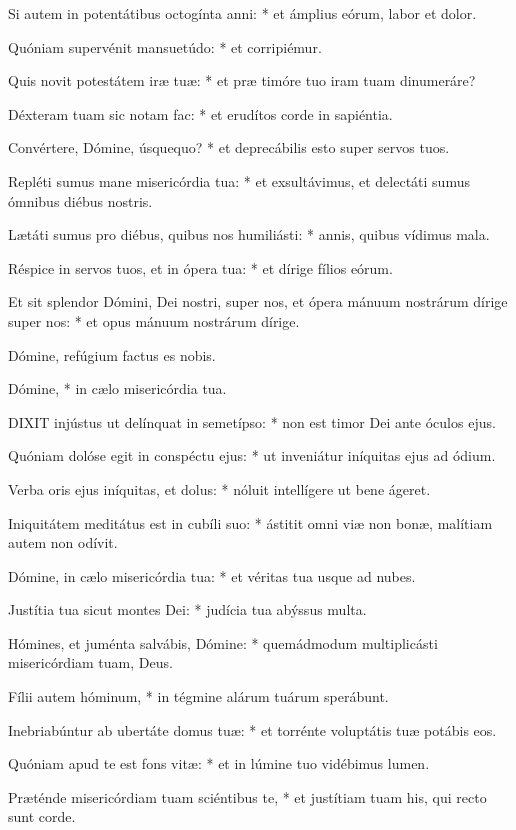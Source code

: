 Si autem in potentátibus octogínta anni: * et ámplius eórum, labor et dolor.

Quóniam supervénit mansuetúdo: * et corripiémur.

Quis novit potestátem iræ tuæ: * et præ timóre tuo iram tuam dinumeráre?

Déxteram tuam sic notam fac: * et erudítos corde in sapiéntia.

Convértere, Dómine, úsquequo? * et deprecábilis esto super servos tuos.

Repléti sumus mane misericórdia tua: * et exsultávimus, et delectáti sumus ómnibus diébus nostris.

Lætáti sumus pro diébus, quibus nos humiliásti: * annis, quibus vídimus mala.

Réspice in servos tuos, et in ópera tua: * et dírige fílios eórum.

Et sit splendor Dómini, Dei nostri, super nos, et ópera mánuum nostrárum dírige super nos: * et opus mánuum nostrárum dírige.

 Dómine, refúgium factus es nobis.

 Dómine, * in cælo misericórdia tua.


\lettrine[lines=2]{D}{IXIT} injústus ut delínquat in semetípso: * non est timor Dei ante óculos ejus.

Quóniam dolóse egit in conspéctu ejus: * ut inveniátur iníquitas ejus ad ódium.

Verba oris ejus iníquitas, et dolus: * nóluit intellígere ut bene ágeret.

Iniquitátem meditátus est in cubíli suo: * ástitit omni viæ non bonæ, malítiam autem non odívit.

Dómine, in cælo misericórdia tua: * et véritas tua usque ad nubes.

Justítia tua sicut montes Dei: * judícia tua abýssus multa.

Hómines, et juménta salvábis, Dómine: * quemádmodum multiplicásti misericórdiam tuam, Deus.

Fílii autem hóminum, * in tégmine alárum tuárum sperábunt.

Inebriabúntur ab ubertáte domus tuæ: * et torrénte voluptátis tuæ potábis eos.

Quóniam apud te est fons vitæ: * et in lúmine tuo vidébimus lumen.

Præténde misericórdiam tuam sciéntibus te, * et justítiam tuam his, qui recto sunt corde.

